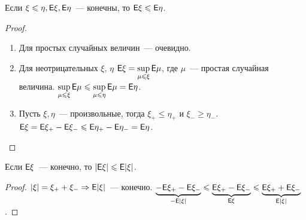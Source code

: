 \begin{property}
	Если $\xi \leqslant \eta, \mathsf{E} \xi, \mathsf{E} \eta$~--- конечны, то $\mathsf{E} \xi \leqslant \mathsf{E} \eta$.
	\begin{proof}
	    \begin{enumerate}
    	    \item Для простых случайных величин~--- очевидно.
    	    
    	    \item Для неотрицательных $\xi$, $\eta$ $\mathsf{E}\xi = \sup\limits_{\mu \leqslant \xi}\mathsf{E}\mu$, где $\mu$~--- простая случайная величина. $\sup\limits_{\mu \leqslant \xi}\mathsf{E}\mu \leqslant \sup\limits_{\mu \leqslant \eta}\mathsf{E}\mu = \mathsf{E}\eta$. 
    	    
    	    \item Пусть $\xi, \eta$~--- произвольные, тогда $\xi_+ \leqslant \eta_+$ и $\xi_- \geqslant \eta_-$. $\mathsf{E}\xi = \mathsf{E}\xi_+ - \mathsf{E}\xi_- \leqslant \mathsf{E}\eta_+ - \mathsf{E}\eta_- = \mathsf{E}\eta$.
	    \end{enumerate}
	\end{proof}
\end{property}
\begin{property}
	Если $\mathsf{E}\xi$~--- конечно, то $|\mathsf{E}\xi| \leqslant \mathsf{E}|\xi|$.
	\begin{proof}
		$|\xi| = \xi_+ + \xi_- \Rightarrow \mathsf{E}|\xi|$~--- конечно. $\underbrace{-\mathsf{E}\xi_+ - \mathsf{E}\xi_-}_{-\mathsf{E}|\xi|} \leqslant \underbrace{\mathsf{E}\xi_+ - \mathsf{E}\xi_-}_{\mathsf{E}\xi} \leqslant \underbrace{\mathsf{E}\xi_+ + \mathsf{E}\xi_-}_{\mathsf{E}|\xi|}$.
	\end{proof}
\end{property}

